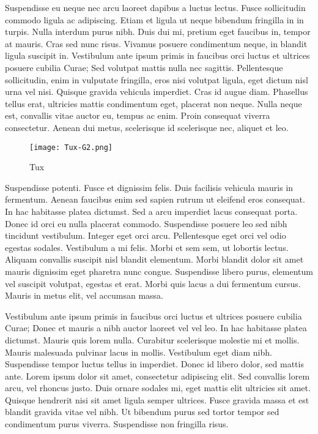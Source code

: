 \documentclass{article}
\begin{document}
Suspendisse eu neque nec arcu laoreet dapibus a luctus lectus. Fusce sollicitudin commodo ligula ac adipiscing. Etiam et ligula ut neque bibendum fringilla in in turpis. Nulla interdum purus nibh. Duis dui mi, pretium eget faucibus in, tempor at mauris. Cras sed nunc risus. Vivamus posuere condimentum neque, in blandit ligula suscipit in. Vestibulum ante ipsum primis in faucibus orci luctus et ultrices posuere cubilia Curae; Sed volutpat mattis nulla nec sagittis. Pellentesque sollicitudin, enim in vulputate fringilla, eros nisi volutpat ligula, eget dictum nisl urna vel nisi. Quisque gravida vehicula imperdiet. Cras id augue diam. Phasellus tellus erat, ultricies mattis condimentum eget, placerat non neque. Nulla neque est, convallis vitae auctor eu, tempus ac enim. Proin consequat viverra consectetur. Aenean dui metus, scelerisque id scelerisque nec, aliquet et leo.
\begin{wrapfigure}{r}{0.5\textwidth}
  \begin{center}
    \texttt{[image: Tux-G2.png]}
  \end{center}
  \caption{Tux}
\end{wrapfigure}
Suspendisse potenti. Fusce et dignissim felis. Duis facilisis vehicula mauris in fermentum. Aenean faucibus enim sed sapien rutrum ut eleifend eros consequat. In hac habitasse platea dictumst. Sed a arcu imperdiet lacus consequat porta. Donec id orci eu nulla placerat commodo. Suspendisse posuere leo sed nibh tincidunt vestibulum. Integer eget orci arcu. Pellentesque eget orci vel odio egestas sodales. Vestibulum a mi felis. Morbi et sem sem, ut lobortis lectus. Aliquam convallis suscipit nisl blandit elementum. Morbi blandit dolor sit amet mauris dignissim eget pharetra nunc congue. Suspendisse libero purus, elementum vel suscipit volutpat, egestas et erat. Morbi quis lacus a dui fermentum cursus. Mauris in metus elit, vel accumsan massa.

Vestibulum ante ipsum primis in faucibus orci luctus et ultrices posuere cubilia Curae; Donec et mauris a nibh auctor laoreet vel vel leo. In hac habitasse platea dictumst. Mauris quis lorem nulla. Curabitur scelerisque molestie mi et mollis. Mauris malesuada pulvinar lacus in mollis. Vestibulum eget diam nibh. Suspendisse tempor luctus tellus in imperdiet. Donec id libero dolor, sed mattis ante. Lorem ipsum dolor sit amet, consectetur adipiscing elit. Sed convallis lorem arcu, vel rhoncus justo. Duis ornare sodales mi, eget mattis elit ultricies sit amet. Quisque hendrerit nisi sit amet ligula semper ultrices. Fusce gravida massa et est blandit gravida vitae vel nibh. Ut bibendum purus sed tortor tempor sed condimentum purus viverra. Suspendisse non fringilla risus. 


\listoffigures
\end{document}
